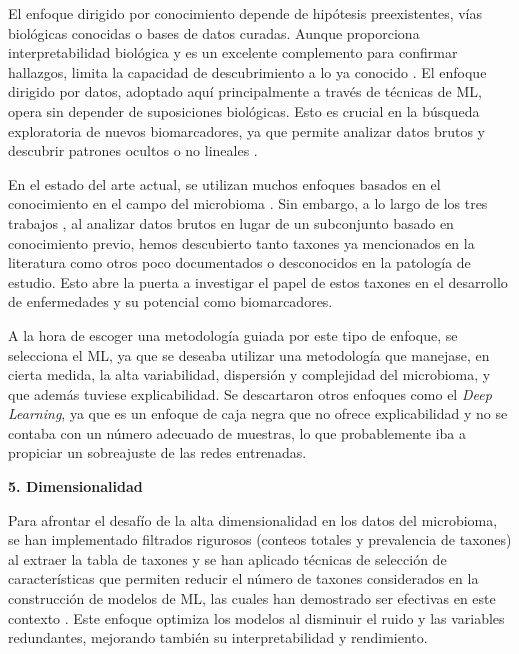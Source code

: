 El enfoque dirigido por conocimiento depende de hipótesis preexistentes, vías biológicas conocidas o bases de datos curadas. Aunque proporciona interpretabilidad biológica y es un excelente complemento para confirmar hallazgos, limita la capacidad de descubrimiento a lo ya conocido \cite{dakal2025advanced}. El enfoque dirigido por datos, adoptado aquí principalmente a través de técnicas de ML, opera sin depender de suposiciones biológicas. Esto es crucial en la búsqueda exploratoria de nuevos biomarcadores, ya que permite analizar datos brutos y descubrir patrones ocultos o no lineales \cite{hemmati2024using}.

En el estado del arte actual, se utilizan muchos enfoques basados en el conocimiento en el campo del microbioma \cite{chong2017computational, bauer2018network, luo2024progress}. Sin embargo, a lo largo de los tres trabajos \cite{paper1, paper2, paper3}, al analizar datos brutos en lugar de un subconjunto basado en conocimiento previo, hemos descubierto tanto taxones ya mencionados en la literatura como otros poco documentados o desconocidos en la patología de estudio. Esto abre la puerta a investigar el papel de estos taxones en el desarrollo de enfermedades y su potencial como biomarcadores.

A la hora de escoger una metodología guiada por este tipo de enfoque, se selecciona el ML, ya que se deseaba utilizar una metodología que manejase, en cierta medida, la alta variabilidad, dispersión y complejidad del microbioma, y que además tuviese explicabilidad. Se descartaron otros enfoques como el \textit{Deep Learning}, ya que es un enfoque de caja negra que no ofrece explicabilidad y no se contaba con un número adecuado de muestras, lo que probablemente iba a propiciar un sobreajuste de las redes entrenadas.


\textbf{5. Dimensionalidad}

Para afrontar el desafío de la alta dimensionalidad en los datos del microbioma, se han implementado filtrados rigurosos (conteos totales y prevalencia de taxones) al extraer la tabla de taxones y se han aplicado técnicas de selección de características que permiten reducir el número de taxones considerados en la construcción de modelos de ML, las cuales han demostrado ser efectivas en este contexto \cite{segata2011metagenomic}. Este enfoque optimiza los modelos al disminuir el ruido y las variables redundantes, mejorando también su interpretabilidad y rendimiento.

